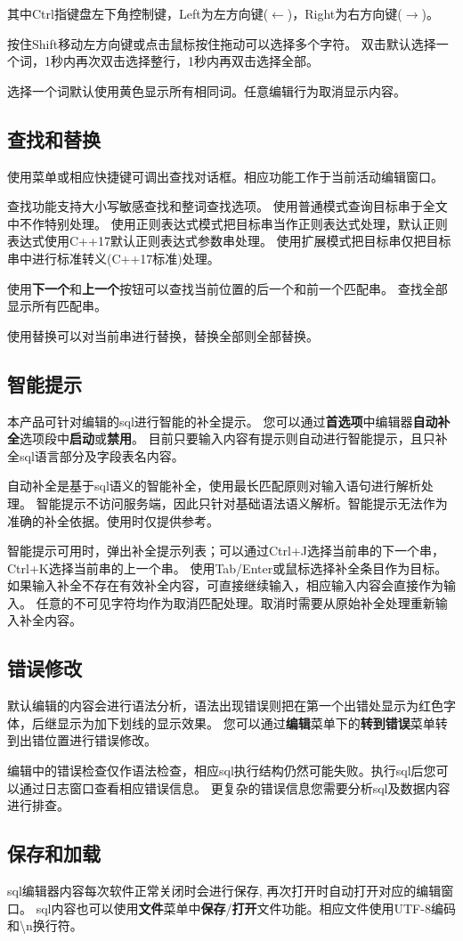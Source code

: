 其中Ctrl指键盘左下角控制键，Left为左方向键($\leftarrow$)，Right为右方向键($\rightarrow$)。

按住Shift移动左方向键或点击鼠标按住拖动可以选择多个字符。
双击默认选择一个词，1秒内再次双击选择整行，1秒内再双击选择全部。

选择一个词默认使用黄色显示所有相同词。任意编辑行为取消显示内容。

\subsection{查找和替换}
\bigskip

 使用菜单或相应快捷键可调出查找对话框。相应功能工作于当前活动编辑窗口。

 查找功能支持大小写敏感查找和整词查找选项。
 使用普通模式查询目标串于全文中不作特别处理。
 使用正则表达式模式把目标串当作正则表达式处理，默认正则表达式使用C++17默认正则表达式参数串处理。
 使用扩展模式把目标串仅把目标串中进行标准转义(C++17标准)处理。

 使用\textbf{下一个}和\textbf{上一个}按钮可以查找当前位置的后一个和前一个匹配串。
 查找全部显示所有匹配串。

 使用替换可以对当前串进行替换，替换全部则全部替换。


\subsection{智能提示}
\bigskip

本产品可针对编辑的sql进行智能的补全提示。
您可以通过\textbf{首选项}中编辑器\textbf{自动补全}选项段中\textbf{启动}或\textbf{禁用}。
目前只要输入内容有提示则自动进行智能提示，且只补全sql语言部分及字段表名内容。

自动补全是基于sql语义的智能补全，使用最长匹配原则对输入语句进行解析处理。
智能提示不访问服务端，因此只针对基础语法语义解析。智能提示无法作为准确的补全依据。使用时仅提供参考。

智能提示可用时，弹出补全提示列表；可以通过Ctrl+J选择当前串的下一个串，Ctrl+K选择当前串的上一个串。
使用Tab/Enter或鼠标选择补全条目作为目标。如果输入补全不存在有效补全内容，可直接继续输入，相应输入内容会直接作为输入。
任意的不可见字符均作为取消匹配处理。取消时需要从原始补全处理重新输入补全内容。

\subsection{错误修改}
\bigskip

默认编辑的内容会进行语法分析，语法出现错误则把在第一个出错处显示为红色字体，后继显示为加下划线的显示效果。
您可以通过\textbf{编辑}菜单下的\textbf{转到错误}菜单转到出错位置进行错误修改。

编辑中的错误检查仅作语法检查，相应sql执行结构仍然可能失败。执行sql后您可以通过日志窗口查看相应错误信息。
更复杂的错误信息您需要分析sql及数据内容进行排查。

\subsection{保存和加载}
\bigskip

sql编辑器内容每次软件正常关闭时会进行保存, 再次打开时自动打开对应的编辑窗口。
sql内容也可以使用\textbf{文件}菜单中\textbf{保存}/\textbf{打开}文件功能。相应文件使用UTF-8编码和\textbackslash n换行符。
